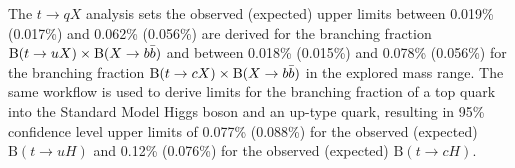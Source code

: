 The $t\to qX$ analysis sets the observed (expected) upper limits between 0.019\% (0.017\%) and 0.062\% (0.056\%) are derived for the branching fraction $\text{B}(t\to uX)\times\text{B}(X\to b\bar{b})$ and between 0.018\% (0.015\%) and 0.078\% (0.056\%) for the branching fraction $\text{B}(t\to cX)\times\text{B}(X\to b\bar{b})$ in the explored mass range. The same workflow is  used to derive limits for the branching fraction of a top quark into the Standard Model Higgs boson and an up-type quark, resulting in 95\% confidence level upper limits of 0.077\% (0.088\%) for the observed (expected) $\text{B}(t\to uH)$ and 0.12\% (0.076\%) for the observed (expected) $\text{B}(t\to cH)$.



